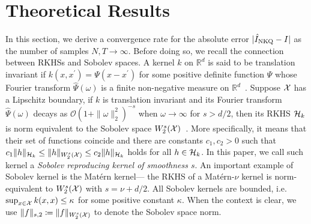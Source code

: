 \section{Theoretical Results}\label{sec:theory}

In this section, we derive a convergence rate for the absolute error $|\hat{I}_{\text{NKQ}} - I|$ as the number of samples $N, T \to \infty$. Before doing so, we recall the connection between RKHSs and Sobolev spaces. A kernel $k$ on $\mathbb{R}^d$ is said to be translation invariant if $k(x, x^\prime) = \Psi(x-x^\prime)$ for some positive definite function $\Psi$ whose Fourier transform $\hat{\Psi}(\omega)$ is a finite non-negative measure on $\mathbb{R}^d$~\citep[Theorem 6.6]{wendland2004scattered}. 
Suppose $\mathcal{X}$ has a Lipschitz boundary, if $k$ is translation invariant and its Fourier transform $\hat{\Psi}(\omega)$ decays as $\mathcal O (1 + \|\omega \|_2^2)^{-s}$ when $\omega \to \infty$ for $s > d/2$, then its RKHS $\mathcal{H}_k$ is norm equivalent to the Sobolev space $W_2^s(\mathcal{X})$~\citep[Corollary 10.48]{wendland2004scattered}.
More specifically, it means that their set of functions coincide and there are constants $c_1,c_2>0$ such that $c_1\|h\|_{\mathcal{H}_k} \leq\|h\|_{W_2^s(\mathcal{X})} \leq c_2\|h\|_{\mathcal{H}_k}$ holds for all $h \in \mathcal{H}_k$. 
In this paper, we call such kernel a \emph{Sobolev reproducing kernel of smoothness $s$}.
An important example of Sobolev kernel is the Matérn kernel--- the RKHS of a Matérn-$\nu$ kernel is norm-equivalent to $W_2^s(\mathcal{X})$ with $s=\nu + d/2$.
All Sobolev kernels are bounded, i.e. $\sup_{x \in \mathcal{X}} k(x, x) \leq \kappa$ for some positive constant $\kappa$. 
When the context is clear, we use $\|f\|_{s,2} \coloneq \|f\|_{W_2^s(\mathcal{X})}$ to denote the Sobolev space norm. 

